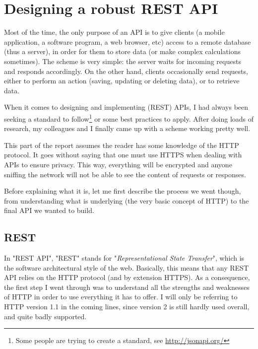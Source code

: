 \chapter[Designing an API]{Designing a robust REST API}\label{chap:api}

Most of the time, the only purpose of an API is to give clients (a mobile application, a software program, a web browser, etc) access to a remote database (thus a server), in order for them to store data (or make complex calculations sometimes). The scheme is very simple: the server waits for incoming requests and responds accordingly. On the other hand, clients occasionally send requests, either to perform an action (saving, updating or deleting data), or to retrieve data.

\medskip

When it comes to designing and implementing (REST) APIs, I had always been seeking a standard to follow\footnote{Some people are trying to create a standard, see \href{http://jsonapi.org/}{http://jsonapi.org/}} or some best practices to apply. After doing loads of research, my colleagues and I finally came up with a scheme working pretty well.

\medskip

This part of the report assumes the reader has some knowledge of the HTTP protocol. It goes without saying that one must use HTTPS when dealing with APIs to ensure privacy. This way, everything will be encrypted and anyone sniffing the network will not be able to see the content of requests or responses.

\medskip

Before explaining what it is, let me first describe the process we went though, from understanding what is underlying (the very basic concept of HTTP) to the final API we wanted to build.

\section{REST}

In "REST API", "REST" stands for "\textit{Representational State Transfer}", which is the software architectural style of the web. Basically, this means that any REST API relies on the HTTP protocol (and by extension HTTPS). As a consequence, the first step I went through was to understand all the strengths and weaknesses of HTTP in order to use everything it has to offer. I will only be referring to HTTP version 1.1 in the coming lines, since version 2 is still hardly used overall, and quite badly supported.

